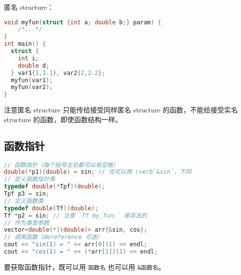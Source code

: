 匿名 structure：
\begin{lstlisting}[language=cpp]
void myfun(struct {int a; double b;} param) {
    /*...*/
}
int main() {
  struct {
    int i;
    double d;
  } var1{1,1.1}, var2{2,2.2};
  myfun(var1);
  myfun(var2);
}
\end{lstlisting}
注意匿名 structure 只能传给接受同样匿名 structure 的函数，不能给接受实名 structure 的函数，即使函数结构一样。

\subsection{函数指针}
\begin{lstlisting}[language=cpp]
// 函数指针（每个括号左右都可以有空格）
double(*p1)(double) = sin; // 也可以用 \verb`&sin`，下同
// 定义函数指针类
typedef double(*Tpf)(double);
Tpf p3 = sin;
// 定义函数类
typedef double(Tf)(double);
Tf *p2 = sin; // 注意 `Tf my_fun;` 是非法的
// 作为类型参数
vector<double(*)(double)> arr{&sin, cos};
// 调用函数（dereference 可选）
cout << "sin(1) = " << arr[0](1) << endl;
cout << "cos(1) = " << (*arr[1])(1) << endl;
\end{lstlisting}

要获取函数指针，既可以用 \verb`函数名` 也可以用 \verb`&函数名`。

